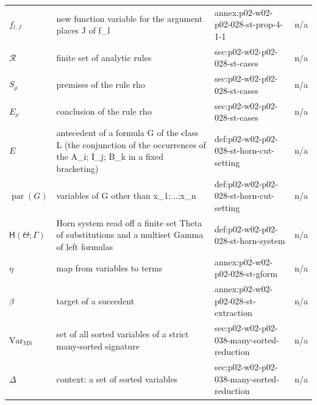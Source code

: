 \begin{longtable}{@{}p{}p{}p{}p{}@{}}
\(f_{l,J}\) & new function variable for the argument places J of f\_l & annex:\allowbreak{}p02-\allowbreak{}w02-\allowbreak{}p02-\allowbreak{}028-\allowbreak{}st-\allowbreak{}prop-\allowbreak{}4-\allowbreak{}1-\allowbreak{}1 & n/a \\
\(\mathcal R\) & finite set of analytic rules & sec:\allowbreak{}p02-\allowbreak{}w02-\allowbreak{}p02-\allowbreak{}028-\allowbreak{}st-\allowbreak{}cases & n/a \\
\(S_\rho\) & premises of the rule rho & sec:\allowbreak{}p02-\allowbreak{}w02-\allowbreak{}p02-\allowbreak{}028-\allowbreak{}st-\allowbreak{}cases & n/a \\
\(E_\rho\) & conclusion of the rule rho & sec:\allowbreak{}p02-\allowbreak{}w02-\allowbreak{}p02-\allowbreak{}028-\allowbreak{}st-\allowbreak{}cases & n/a \\
\(E\) & antecedent of a formula G of the class L (the conjunction of the occurrences of the A\_i; I\_j; B\_k in a fixed bracketing) & def:\allowbreak{}p02-\allowbreak{}w02-\allowbreak{}p02-\allowbreak{}028-\allowbreak{}st-\allowbreak{}horn-\allowbreak{}cut-\allowbreak{}setting & n/a \\
\(\operatorname{par}(G)\) & variables of G other than x\_1;...;x\_n & def:\allowbreak{}p02-\allowbreak{}w02-\allowbreak{}p02-\allowbreak{}028-\allowbreak{}st-\allowbreak{}horn-\allowbreak{}cut-\allowbreak{}setting & n/a \\
\(\mathsf H(\Theta;\allowbreak \Gamma)\) & Horn system read off a finite set Theta of substitutions and a multiset Gamma of left formulas & def:\allowbreak{}p02-\allowbreak{}w02-\allowbreak{}p02-\allowbreak{}028-\allowbreak{}st-\allowbreak{}horn-\allowbreak{}system & n/a \\
\(\eta\) & map from variables to terms & annex:\allowbreak{}p02-\allowbreak{}w02-\allowbreak{}p02-\allowbreak{}028-\allowbreak{}st-\allowbreak{}gform & n/a \\
\(\beta\) & target of a succedent & annex:\allowbreak{}p02-\allowbreak{}w02-\allowbreak{}p02-\allowbreak{}028-\allowbreak{}st-\allowbreak{}extraction & n/a \\
\(\mathrm{Var}_{\mathrm{MS}}\) & set of all sorted variables of a strict many-sorted signature & sec:\allowbreak{}p02-\allowbreak{}w02-\allowbreak{}p02-\allowbreak{}038-\allowbreak{}many-\allowbreak{}sorted-\allowbreak{}reduction & n/a \\
\(\Delta\) & context: a set of sorted variables & sec:\allowbreak{}p02-\allowbreak{}w02-\allowbreak{}p02-\allowbreak{}038-\allowbreak{}many-\allowbreak{}sorted-\allowbreak{}reduction & n/a \\

\end{longtable}
